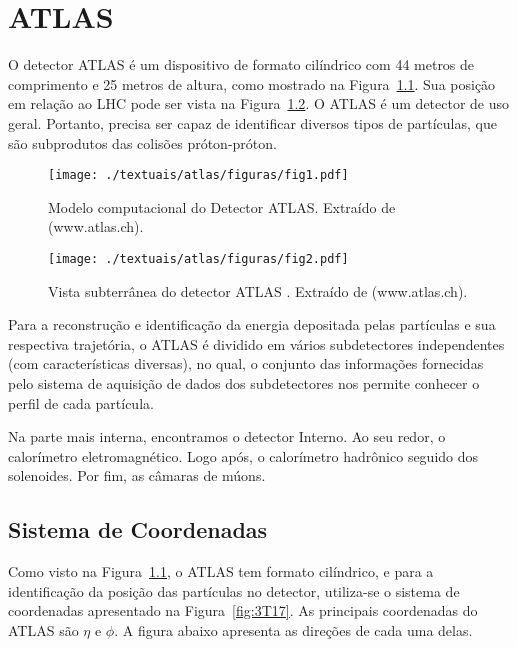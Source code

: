 \chapter{ATLAS}\label{cap:atlas}

O detector ATLAS \cite{aad2008atlas} é um dispositivo de formato cilíndrico com 44 metros de comprimento e 25 metros de altura, como mostrado na Figura~\ref{fig:3T02}. Sua posição em relação ao LHC pode ser vista na Figura~\ref{fig:3T01}. O ATLAS é um detector de uso geral. Portanto, precisa ser capaz de identificar diversos tipos de partículas, que são subprodutos das colisões próton-próton.

\begin{figure}[h!]
	\centering
	\texttt{[image: ./textuais/atlas/figuras/fig1.pdf]}\\
	\caption{Modelo computacional do Detector ATLAS. Extraído de (www.atlas.ch).}
	\label{fig:3T02}
\end{figure}

\begin{figure}[h!]
	\centering
	\texttt{[image: ./textuais/atlas/figuras/fig2.pdf]}\\
	\caption{Vista subterrânea do detector ATLAS . Extraído de (www.atlas.ch).}
	\label{fig:3T01}
\end{figure}

	Para a reconstrução e identificação da energia depositada pelas partículas e sua respectiva trajetória, o ATLAS é dividido em vários subdetectores independentes (com características diversas), no qual, o conjunto das informações fornecidas pelo sistema de aquisição de dados dos subdetectores nos permite conhecer o perfil de cada partícula.

	Na parte mais interna, encontramos o detector Interno.  Ao seu redor, o calorímetro eletromagnético. Logo após, o calorímetro hadrônico seguido dos solenoides.  Por fim, as câmaras de múons.

\section{Sistema de Coordenadas}

Como visto na Figura~\ref{fig:3T02}, o \ac{ATLAS} tem  formato cilíndrico, e para a identificação da posição das partículas no detector, utiliza-se o sistema de coordenadas \cite{aad2008atlas} apresentado na Figura~\ref{fig:3T17}.
As principais coordenadas do ATLAS são $\eta$ e $\phi$. A figura abaixo apresenta as direções de cada uma delas.

